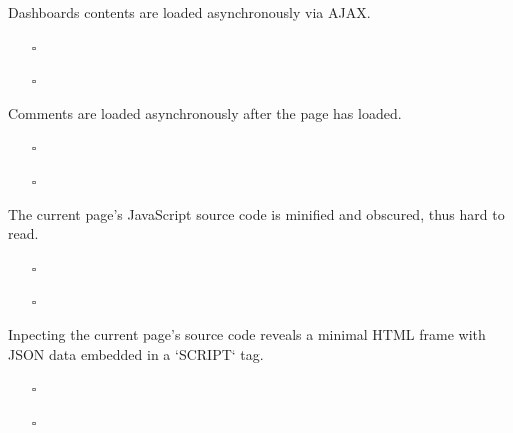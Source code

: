 \documentclass{beamer}
\begin{document}
\begin{frame}
  Dashboards contents are loaded asynchronously via AJAX.

  \vspace{0.3cm}
  \begin{itemize}
    \item[$\square$] 
    \item[$\square$] 
  \end{itemize}

\end{frame}

\begin{frame}
  Comments are loaded asynchronously after the page has loaded.

  \vspace{0.3cm}
  \begin{itemize}
    \item[$\square$] 
    \item[$\square$] 
  \end{itemize}

\end{frame}

\begin{frame}
  The current page's JavaScript source code is minified and obscured, thus hard
  to read.

  \vspace{0.3cm}
  \begin{itemize}
    \item[$\square$] 
    \item[$\square$] 
  \end{itemize}

\end{frame}

\begin{frame}
  Inpecting the current page's source code reveals a minimal HTML frame with
  JSON data embedded in a `SCRIPT` tag.

  \vspace{0.3cm}
  \begin{itemize}
    \item[$\square$] 
    \item[$\square$] 
  \end{itemize}

\end{frame}
\end{document}
